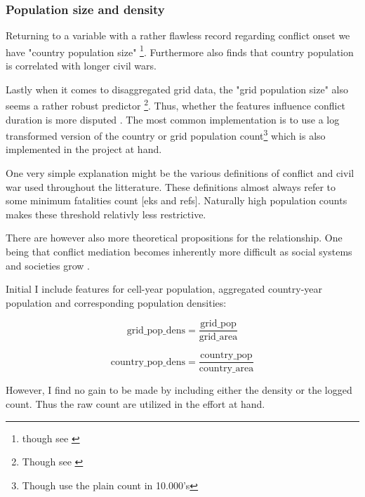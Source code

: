 \documentclass[a4paper]{article}
\begin{document}
\subsubsection{Population size and density} 

Returning to a variable with a rather flawless record regarding conflict onset we have "country population size" \citep{Collier_Hoeffler_1998, Fearon_Laitin_2003, Collier_Hoeffler_2004, Hegre_Sambanis_2006}\footnote{though see \cite{Goldstone_2010}}. Furthermore \cite[287]{Fearon_2004} also finds that country population is correlated with longer civil wars.\par

Lastly when it comes to disaggregated grid data, the "grid population size" also seems a rather robust predictor \citep{Buhaug_2010, Cederman_Gleditsch_Buhaug_2013}\footnote{Though see \cite{Hegre_Oestby_Raleigh_2009}}. Thus, whether the features influence conflict duration is more disputed \citep{Collier_Hoeffler_1998, Fearon_2004}. The most common implementation is to use a log transformed version of the country or grid population count\footnote{Though \cite{Collier_Hoeffler_1998} use the plain count in 10.000's} which is also implemented in the project at hand.\par

One very simple explanation might be the various definitions of conflict and civil war used throughout the litterature. These definitions almost always refer to some minimum fatalities count [eks and refs]. Naturally high population counts makes these threshold relativly less restrictive.\par

There are however also more theoretical propositions for the relationship. One being that conflict mediation becomes inherently more difficult as social systems and societies grow \cite[p- 271-272]{Diamond_1998}.\par

Initial I include features for cell-year population, aggregated country-year population and corresponding population densities:

$$\textrm{grid\_pop\_dens} = \frac{\textrm{grid\_pop}}{\textrm{grid\_area}}$$

$$\textrm{country\_pop\_dens} = \frac{\textrm{country\_pop}}{\textrm{country\_area}}$$

However, I find no gain to be made by including either the density or the logged count. Thus the raw count are utilized in the effort at hand.\par
\end{document}
